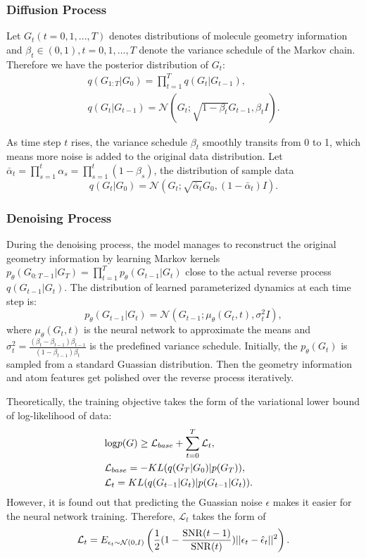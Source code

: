 \documentclass[letterpaper]{article} %
\begin{document}
\subsubsection{Diffusion Process}
Let $G_t (t=0, 1, ..., T)$ denotes distributions of molecule geometry information and $\beta_t \in (0, 1), t=0, 1, ..., T$ denote the variance schedule of the Markov chain. Therefore we have the posterior distribution of $G_t$:
\begin{eqnarray}
  &q(G_{1:T} | G_0) = \prod^T_{t=1} q(G_t | G_{t-1}), &\\
  &q(G_t | G_{t-1}) = \mathcal{N}(G_t; \sqrt{1-\beta_t}G_{t-1}, \beta_t I).&
\end{eqnarray}

As time step $t$ rises, the variance schedule $\beta_t$ smoothly transits from 0 to 1, which means more noise is added to the original data distribution. Let $\bar{\alpha}_t = \prod^t_{s=1} \alpha_s = \prod^t_{s=1}(1-\beta_s)$, the distribution of sample data
\begin{equation}
    q(G_t|G_0) = \mathcal{N}(G_t; \sqrt{\bar{\alpha}_t} G_0, (1 - \bar{\alpha}_t) I).
\end{equation}

\subsubsection{Denoising Process}
During the denoising process, the model manages to reconstruct the original geometry information by learning Markov kernels $p_\theta(G_{0:T-1}| G_{T}) = \prod^T_{t=1} p_\theta(G_{t-1} | G_t)$ close to the actual reverse process $q(G_{t-1} | G_t)$. The distribution of learned parameterized dynamics at each time step is:
\begin{equation}
  p_\theta(G_{t-1} | G_t) = \mathcal{N}(G_{t-1}; \mu_\theta(G_t, t), \sigma_t^2 I),
\end{equation}
where $\mu_\theta(G_t, t)$ is the neural network to approximate the means and $\sigma^2_t = \frac{(\beta_t - \beta_{t-1})\beta_{t-1}}{(1 - \beta_{t-1}) \beta_t}$ is the predefined variance schedule. Initially, the $p_\theta(G_t)$ is sampled from a standard Guassian distribution. Then the geometry information and atom features get polished over the reverse process iteratively.

Theoretically, the training objective takes the form of the variational lower bound of log-likelihood of data:
\begin{eqnarray}
    &{\rm log}p(G) \geq \mathcal{L}_{base} + \sum_{t=0}^T \mathcal{L}_t,& \\
    &\mathcal{L}_{base} = -KL(q(G_T|G_0)|p(G_T)),& \\
    &\mathcal{L}_t = KL(q(G_{t-1}|G_t)|p(G_{t-1}|G_t)). &
\end{eqnarray}
However, it is found out that predicting the Guassian noise $\epsilon$ makes it easier for the neural network training. Therefore, $\mathcal{L}_t$ \cite{vaediff_21_kingma} takes the form of
\begin{equation}
    \mathcal{L}_t = E_{\epsilon_t \sim \mathcal{N}(0, I)}\left(\frac{1}{2}(1- \frac{{\rm SNR}(t-1)}{{\rm SNR}(t)})||\epsilon_t - \hat{\epsilon}_t||^2\right).
\end{equation}
\end{document}
